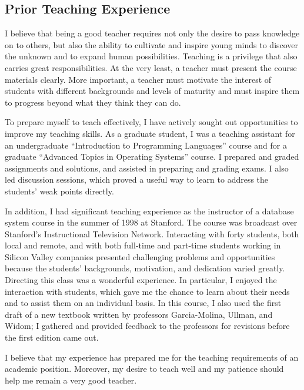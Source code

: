 \subsection{Prior Teaching Experience}

I believe that being a good teacher requires not only the desire to
pass knowledge on to others, but also the ability to
cultivate and inspire young minds to discover the unknown
and to expand human possibilities.
Teaching is a privilege that also carries
great responsibilities. At the very least, a teacher must
present the course materials clearly.  More important,
a teacher must motivate the interest
of students with different backgrounds and levels of
maturity and must inspire them to progress
beyond what they think they can do. 

To prepare myself to teach effectively, I have actively sought out
opportunities to improve my teaching skills.
As a graduate student, I was a teaching assistant for an undergraduate 
``Introduction to Programming Languages'' course and for a graduate 
``Advanced Topics in Operating Systems'' course.
I prepared and graded assignments and solutions, and assisted
in preparing and grading exams. I also led discussion
sessions, which proved a useful way to learn to address the
students' weak points directly.
                                  
In addition, I had significant teaching experience as
the instructor of a database system course in the
summer of 1998 at Stanford. 
The course was broadcast over Stanford's Instructional
Television Network. Interacting with forty students,
both local and remote,
and with both full-time and part-time students working in Silicon
Valley companies presented challenging problems and
opportunities because the students' backgrounds, motivation,
and dedication varied greatly.
Directing this class was a wonderful experience. In particular,
I enjoyed the interaction with students, which gave me
the chance to learn about their needs and to assist them on an
individual basis. In this course, I also used the first draft of a new
textbook written by professors Garcia-Molina, Ullman,
and Widom; I gathered and provided feedback to the
professors for revisions before the first edition came out.

I believe that my experience has prepared me for the teaching
requirements of an academic position. Moreover,
my desire to teach well and my patience should
help me remain a very good teacher.

